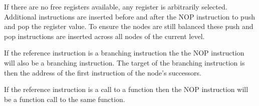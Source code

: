 If there are no free registers available, any register is arbitrarily selected. Additional instructions are inserted before and after the NOP instruction to push and pop the register value. To ensure the nodes are 
still balanced these push and pop instructions are inserted across all nodes of the current level. 

If the reference instruction is a branching instruction the the NOP instruction will also be a branching instruction. The target of the branching instruction is then the address of the first instruction of the node's successors. 

If the reference instruction is a call to a function then the NOP instruction will be a function call to the same function.

\begin{algorithm*}
  \SetAlgoLined
  \DontPrintSemicolon
  
  
   

\end{algorithm*}
